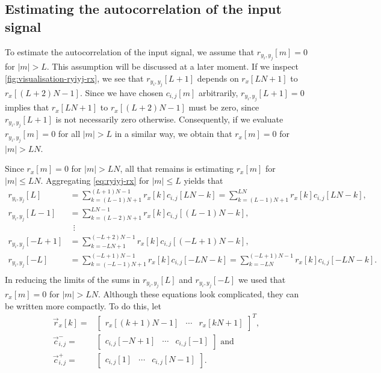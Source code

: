 \documentclass[a4paper, openany, oneside]{memoir}
\begin{document}
\subsection{Estimating the autocorrelation of the input signal}
To estimate the autocorrelation of the input signal, we assume that $r_{y_i,y_j}[m]=0$ for $|m| > L$. This assumption will be discussed at a later moment. If we inspect \cref{fig:visualisation-ryiyj-rx}, we see that $r_{y_i,y_j}[L+1]$ depends on $r_x[LN+1]$ to $r_x[(L+2)N-1]$. Since we have chosen $c_{i,j}[m]$ arbitrarily, $r_{y_i,y_j}[L+1]=0$ implies that $r_x[LN+1]$ to $r_x[(L+2)N-1]$ must be zero, since $r_{y_i,y_j}[L+1]$ is not necessarily zero otherwise. Consequently, if we evaluate $r_{y_i,y_j}[m]=0$ for all $|m| > L$ in a similar way, we obtain that $r_x[m]=0$ for $|m| > LN$.

Since $r_x[m]=0$ for $|m| > LN$, all that remains is estimating $r_x[m]$ for $|m| \le LN$. Aggregating \cref{eq:ryiyj-rx} for $|m| \le L$ yields that
\begin{align*}
    r_{y_i,y_j}[L] &= \sum_{k=(L-1)N+1}^{(L+1)N-1}r_{x}[k]c_{i,j}[LN-k] = \sum_{k=(L-1)N+1}^{LN}r_{x}[k]c_{i,j}[LN-k], \\
    r_{y_i,y_j}[L-1] &= \sum_{k=(L-2)N+1}^{LN-1}r_{x}[k]c_{i,j}[(L-1)N-k], \\
    &~~\vdots \\
    r_{y_i,y_j}[-L+1] &= \sum_{k=-LN+1}^{(-L+2)N-1}r_{x}[k]c_{i,j}[(-L+1)N-k], \\
    r_{y_i,y_j}[-L] &= \sum_{k=(-L-1)N+1}^{(-L+1)N-1}r_{x}[k]c_{i,j}[-LN-k] = \sum_{k=-LN}^{(-L+1)N-1}r_{x}[k]c_{i,j}[-LN-k]. \\
\end{align*}
In reducing the limits of the sums in $r_{y_i,y_j}[L]$ and $r_{y_i,y_j}[-L]$ we used that $r_x[m]=0$ for $|m| > LN$. Although these equations look complicated, they can be written more compactly. To do this, let
\begin{align*}
    \vec{r}_x[k] =& \begin{bmatrix}
        r_x[(k+1)N-1] & \cdots & r_x[kN+1]
    \end{bmatrix}^T, \\
    \vec{c}^{-}_{i,j} =& \begin{bmatrix}
        c_{i,j}[-N+1] & \cdots & c_{i,j}[-1]
    \end{bmatrix} \text{ and } \\
    \vec{c}^{+}_{i,j} =& \begin{bmatrix}
        c_{i,j}[1] & \cdots & c_{i,j}[N-1]
    \end{bmatrix}.
\end{align*}
\end{document}
